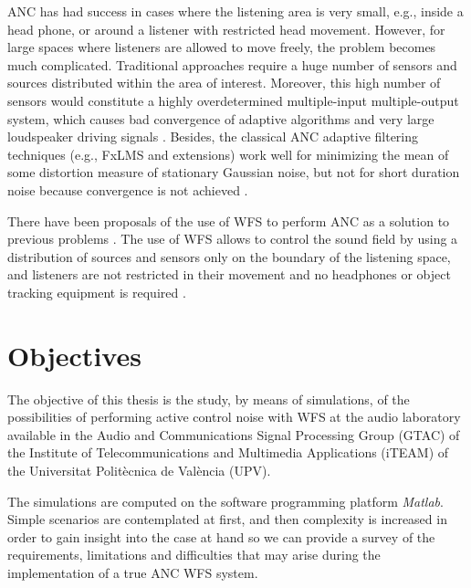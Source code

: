 ANC has had success in cases where the listening area is very small, e.g., inside a head phone, or around a listener with restricted head movement. However, for large spaces where listeners are allowed to move freely, the problem becomes much complicated. Traditional approaches require a huge number of sensors and sources distributed within the area of interest. Moreover, this high number of sensors would constitute a highly overdetermined multiple-input multiple-output system, which causes bad convergence of adaptive algorithms and very large loudspeaker driving signals \cite{Kuntz2004}. Besides, the classical ANC adaptive filtering techniques (e.g., FxLMS and extensions) work well for minimizing the mean of some distortion measure of stationary Gaussian noise, but not for short duration noise because convergence is not achieved \cite{Lapini2016}.

There have been proposals of the use of WFS to perform ANC as a solution to previous problems \cite{Lapini2016,Kuntz2004,Zanolin1999,Morcillo2015}. The use of WFS allows to control the sound field by using a distribution of sources and sensors only on the boundary of the listening space, and listeners are not restricted in their movement and no headphones or object tracking equipment is required \cite{Kuntz2004}.

\section{Objectives}

The objective of this thesis is the study, by means of simulations, of the possibilities of performing active control noise with WFS at the audio laboratory available in the Audio and Communications Signal Processing Group (GTAC) of the Institute of Telecommunications and Multimedia Applications (iTEAM) of the Universitat Politècnica de València (UPV).

The simulations are computed on the software programming platform \emph{Matlab}. Simple scenarios are contemplated at first, and then complexity is increased in order to gain insight into the case at hand so we can provide a survey of the requirements, limitations and difficulties that may arise during the implementation of a true ANC WFS system.
